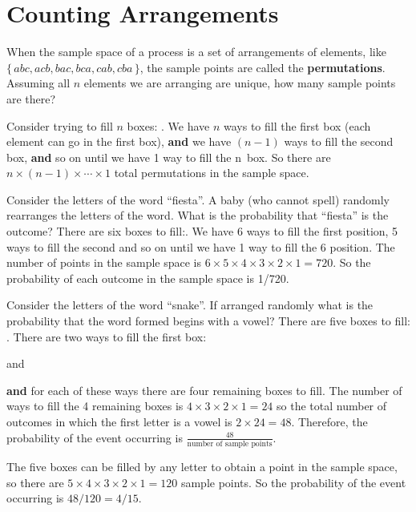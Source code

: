 \section{Counting Arrangements}
When the sample space of a process is a set of arrangements of elements, like~$\{\,abc, acb, bac, bca, cab, cba\,\}$, the sample points are called the \textbf{permutations}. Assuming all $n$ elements we are arranging are unique, how many sample points are there?
\smallskip\par
Consider trying to fill $n$ boxes: .
We have $n$ ways to fill the first box (each element can go in the first box), \textbf{and} we have $(n-1)$ ways to fill the second box, \textbf{and} so on until we have 1 way to fill the n~box. So there are $n \times (n-1) \times \cdots \times 1$ total permutations in the sample space.
\begin{example}
Consider the letters of the word ``fiesta''. A baby (who cannot spell) randomly rearranges the letters of the word. What is the probability that ``fiesta'' is the outcome?
\tcblower
There are six boxes to fill:.
We have 6 ways to fill the first position, 5 ways to fill the second and so on until we have 1 way to fill the 6 position. The number of points in the sample space is $6 \times 5 \times 4 \times 3 \times 2 \times 1 = 720$. So the probability of each outcome in the sample space is 1/720.
\end{example}
\begin{example}
Consider the letters of the word ``snake''. 
If arranged randomly what is the probability that the word formed begins with a vowel?
\tcblower
There are five boxes to fill: . There are two ways to fill the first box: 
\begin{center}
 and 
\end{center}
\textbf{and} for each of these ways there are four remaining boxes to fill. The number of ways to fill the 4 remaining boxes is $4 \times 3 \times 2 \times 1 = 24$ so the total number of outcomes in which the first letter is a vowel is $2 \times 24 = 48$. Therefore, the probability of the event occurring is $\frac{48}{\text{number of sample points}}$.
\smallskip\par
The five boxes can be filled by any letter to obtain a point in the sample space, so there are $5 \times 4 \times 3 \times 2 \times 1 = 120$ sample points. So the probability of the event occurring is $48/120 = 4/15$.
\end{example}
